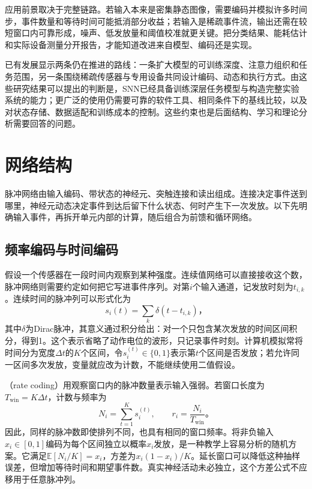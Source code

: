 应用前景取决于完整链路。若输入本来是密集静态图像，需要编码并模拟许多时间步，事件数量和等待时间可能抵消部分收益；若输入是稀疏事件流，输出还需在较短窗口内可靠形成，噪声、低发放量和阈值校准就更关键。把分类结果、能耗估计和实际设备测量分开报告，才能知道改进来自模型、编码还是实现。

已有发展显示两条仍在推进的路线：一条扩大模型的可训练深度、注意力组织和任务范围，另一条围绕稀疏传感器与专用设备共同设计编码、动态和执行方式。由这些研究结果可以提出的判断是，SNN已经具备训练深层任务模型与构造完整实验系统的能力；更广泛的使用仍需要可靠的软件工具、相同条件下的基线比较，以及对状态存储、数据适配和训练成本的控制。这些约束也是后面结构、学习和理论分析需要回答的问题。

\section{网络结构}
\label{sec:snn-coding-dynamics}

脉冲网络由输入编码、带状态的神经元、突触连接和读出组成。连接决定事件送到哪里，神经元动态决定事件到达后留下什么状态、何时产生下一次发放。以下先明确输入事件，再拆开单元内部的计算，随后组合为前馈和循环网络。

\subsection{频率编码与时间编码}
\label{sec:snn-coding}

假设一个传感器在一段时间内观察到某种强度。连续值网络可以直接接收这个数，脉冲网络则需要约定如何把它写进事件序列。对第$i$个输入通道，记发放时刻为$t_{i,k}$。连续时间的脉冲列可以形式化为
\begin{equation}
  s_i(t)=\sum_k\delta(t-t_{i,k})\text{，}
  \label{eq:snn-spike-train}
\end{equation}
其中$\delta$为Dirac脉冲，其意义通过积分给出：对一个只包含某次发放的时间区间积分，得到1。这个表示省略了动作电位的波形，只记录事件时刻。计算机模拟常将时间分为宽度$\Delta t$的$K$个区间，令$s_i^{(t)}\in\{0,1\}$表示第$t$个区间是否发放；若允许同一区间多次发放，变量就应改为计数，不能继续使用二值假设。

（rate coding）用观察窗口内的脉冲数量表示输入强弱。若窗口长度为$T_{\mathrm{win}}=K\Delta t$，计数与频率为
\begin{equation}
  N_i=\sum_{t=1}^{K}s_i^{(t)},\qquad
  r_i=\frac{N_i}{T_{\mathrm{win}}}\text{。}
  \label{eq:snn-rate-code}
\end{equation}
因此，同样的脉冲数即使排列不同，也具有相同的窗口频率。将非负输入$x_i\in[0,1]$编码为每个区间独立以概率$x_i$发放，是一种教学上容易分析的随机方案。它满足$\mathbb E[N_i/K]=x_i$，方差为$x_i(1-x_i)/K$。延长窗口可以降低这种抽样误差，但增加等待时间和期望事件数。真实神经活动未必独立，这个方差公式不应移用于任意脉冲列。

